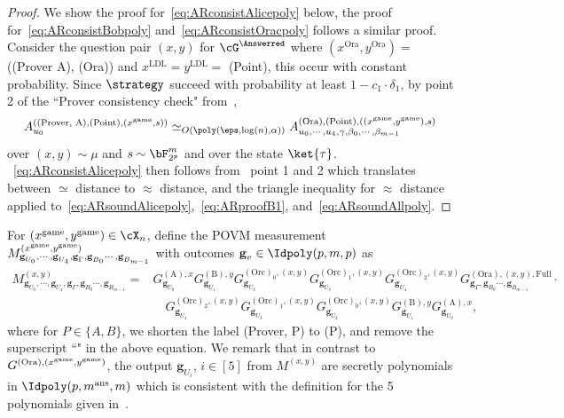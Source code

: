 \begin{proof}
	We show the proof for~\eqref{eq:ARconsistAlicepoly} below, the proof for~\eqref{eq:ARconsistBobpoly} and~\eqref{eq:ARconsistOracpoly} follows a similar proof. Consider the question pair $(x,y)$ for $\cG^{\Answerred}$ where $(x^{\text{Ora}}, y^{\text{Ora}}) =$ ((Prover A), (Ora)) and $x^{\text{LDL}} = y^{\text{LDL}} = $ (Point), this occur with constant probability. Since $\strategy$ succeed with probability at least $1-  c_1 \cdot\delta_1$, by point 2 of the ``Prover consistency check" from~,
	\begin{equation} \label{eq:ARproofB1}
		A^{((\text{Prover, A}), (\text{Point}), (x^{\game} ,s))}_{u_0} \simeq_{O(\poly(\eps, \log(n), \alpha))} A^{(\text{Ora}), (\text{Point}), ((x^{\game}, y^{\game}) ,s)}_{u_0, \cdots, u_4, \gamma, \beta_0, \cdots,\beta_{m-1}} 
	\end{equation}
	over $(x,y) \sim \mu$ and $s \sim \bF_{2^p}^m$ and over the state $\ket{\tau}$. ~\eqref{eq:ARconsistAlicepoly} then follows from~ point 1 and 2 which translates between $\simeq$ distance to $\approx$ distance, and the triangle inequality for $\approx$ distance applied to~\eqref{eq:ARsoundAlicepoly},~\eqref{eq:ARproofB1}, and~\eqref{eq:ARsoundAllpoly}. 
\end{proof}

For $(x^{\game}, y^{\game}) \in \cX_n$, define the POVM measurement $M^{(x^{\text{game}}, y^{\text{game}})}_{\textbf{g}_{U_0}, \cdots, \textbf{g}_{U_4}, \textbf{g}_{\Gamma}, \textbf{g}_{B_0} \cdots,\textbf{g}_{B_{m-1}}}$ with outcomes $\textbf{g}_v \in \Idpoly(p,m,p)$ as
\begin{align*}
	M^{(x, y)}_{\textbf{g}_{U_0}, \cdots, \textbf{g}_{U_4}, \textbf{g}_{\Gamma}, \textbf{g}_{B_0} \cdots,\textbf{g}_{B_{m-1}}} = &G_{\textbf{g}_{U_0}}^{(\text{A}), x} G_{\textbf{g}_{U_1}}^{(\text{B}), y}  G_{\textbf{g}_{U_2}}^{(\text{Orc})_0, (x,y)}  G_{\textbf{g}_{U_3}}^{(\text{Orc})_1, (x,y)}  G_{\textbf{g}_{U_4}}^{(\text{Orc})_2, (x,y)} 	G_{\textbf{g}_{\Gamma}, \textbf{g}_{B_0} \cdots,\textbf{g}_{B_{m-1}}}^{(\text{Ora}), (x, y), \text{Full}} \cdot \\
	&\quad G_{\textbf{g}_{U_4}}^{(\text{Orc})_2, (x,y)}  G_{\textbf{g}_{U_3}}^{(\text{Orc})_1, (x,y)}  G_{\textbf{g}_{U_2}}^{(\text{Orc})_0, (x,y)} G_{\textbf{g}_{U_1}}^{(\text{B}), y} G_{\textbf{g}_{U_0}}^{(\text{A}), x}, 
\end{align*}
where for $P \in \{A,B\}$, we shorten the label (Prover, P) to (P), and remove the superscript ``\game" in the above equation. We remark that in contrast to $G^{(\text{Ora}), (x^{\text{game}}, y^{\text{game}})}$, the output $\textbf{g}_{U_i}$, $i \in [5]$ from $M^{(x, y)}$ are secretly polynomials in $\Idpoly(p, m^{\text{ans}},m)$ which is consistent with the definition for the 5 polynomials given in~. 

